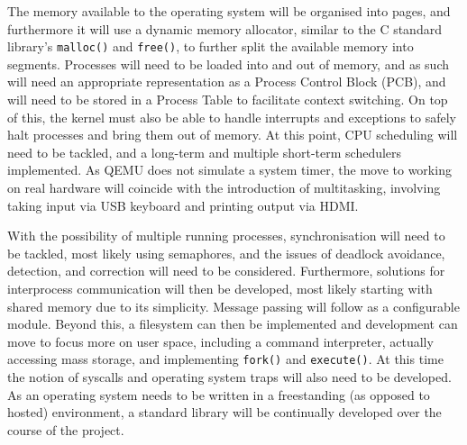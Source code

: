 \documentclass[10pt,a4paper]{article}
\newcommand{\code}[1]{\texttt{#1}}
\begin{document}
The memory available to the operating system will be organised into pages, and
furthermore it will use a dynamic memory allocator, similar to the C standard
library's \code{malloc()} and \code{free()}, to further split the available
memory into segments. Processes will need to be loaded into and out of memory,
and as such will need an appropriate representation as a Process Control Block
(PCB), and will need to be stored in a Process Table to facilitate context
switching. On top of this, the kernel must also be able to handle interrupts and
exceptions to safely halt processes and bring them out of memory. At this point,
CPU scheduling will need to be tackled, and a long-term and multiple short-term
schedulers implemented. As QEMU does not simulate a system timer, the move to
working on real hardware will coincide with the introduction of multitasking,
involving taking input via USB keyboard and printing output via HDMI.

With the possibility of multiple running processes, synchronisation will need to
be tackled, most likely using semaphores, and the issues of deadlock avoidance,
detection, and correction will need to be considered. Furthermore, solutions for
interprocess communication will then be developed, most likely starting with
shared memory due to its simplicity. Message passing will follow as a
configurable module. Beyond this, a filesystem can then be implemented and
development can move to focus more on user space, including a command
interpreter, actually accessing mass storage, and implementing \code{fork()} and
\code{execute()}. At this time the notion of syscalls and operating system traps
will also need to be developed. As an operating system needs to be written in a
freestanding (as opposed to hosted) environment, a standard library will be
continually developed over the course of the project.
\end{document}
